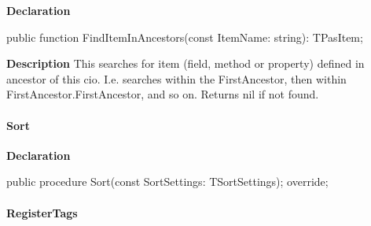 \documentclass{report}
\newif\ifpdf
\begin{document}
\label{PasDoc_Items.TPasCio-FindItemInAncestors}
\begin{list}{}{
\setlength{\itemindent}{0cm}
\setlength{\listparindent}{0cm}
\setlength{\leftmargin}{\evensidemargin}
\addtolength{\leftmargin}{\tmplength}
\settowidth{\labelsep}{X}
\addtolength{\leftmargin}{\labelsep}
\setlength{\labelwidth}{\tmplength}
}
\item[\textbf{Declaration}\hfill]
\ifpdf
\begin{flushleft}
\fi
\begin{ttfamily}
public function FindItemInAncestors(const ItemName: string): TPasItem;\end{ttfamily}

\ifpdf
\end{flushleft}
\fi

\par
\item[\textbf{Description}]
This searches for item (field, method or property) defined in ancestor of this cio. I.e. searches within the FirstAncestor, then within FirstAncestor.FirstAncestor, and so on. Returns nil if not found.

\end{list}
\paragraph*{Sort}\hspace*{\fill}

\label{PasDoc_Items.TPasCio-Sort}
\begin{list}{}{
\setlength{\itemindent}{0cm}
\setlength{\listparindent}{0cm}
\setlength{\leftmargin}{\evensidemargin}
\addtolength{\leftmargin}{\tmplength}
\settowidth{\labelsep}{X}
\addtolength{\leftmargin}{\labelsep}
\setlength{\labelwidth}{\tmplength}
}
\item[\textbf{Declaration}\hfill]
\ifpdf
\begin{flushleft}
\fi
\begin{ttfamily}
public procedure Sort(const SortSettings: TSortSettings); override;\end{ttfamily}

\ifpdf
\end{flushleft}
\fi

\end{list}
\paragraph*{RegisterTags}\hspace*{\fill}
\end{document}
